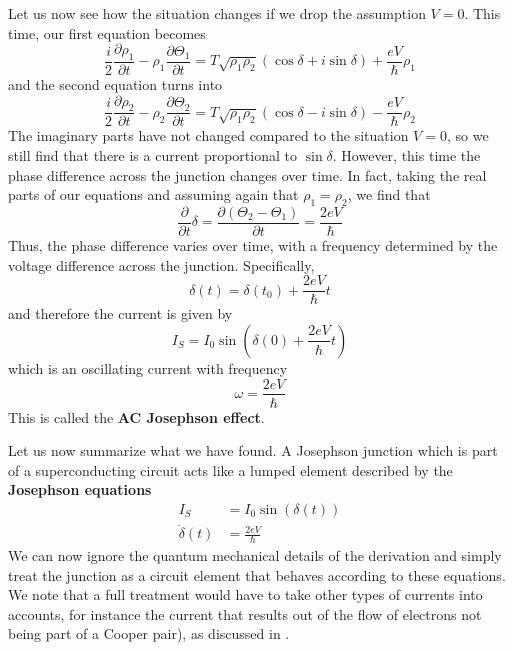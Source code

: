 \documentclass[a4paper, draft]{article}
\theoremstyle{own}
\theoremstyle{remark}
\begin{document}
Let us now see how the situation changes if we drop the assumption $V = 0$. This time, our first equation becomes
$$
\frac{i }{2} \frac{\partial \rho_1}{\partial t} 
- 
\rho_1 \frac{\partial \Theta_1}{\partial t}
=
 T \sqrt{\rho_1 \rho_2} (\cos \delta + i \sin \delta) + \frac{eV}{\hbar} \rho_1
$$
and the second equation turns into
$$
\frac{i }{2} \frac{\partial \rho_2}{\partial t} 
- 
\rho_2 \frac{\partial \Theta_2}{\partial t}
=
T \sqrt{\rho_1 \rho_2} (\cos \delta - i \sin \delta) - \frac{eV}{\hbar} \rho_2
$$
The imaginary parts have not changed compared to the situation $V = 0$, so we still find that there is a current proportional to $\sin \delta$. However, this time the phase difference across the junction changes over time. In fact, taking the real parts of our equations and assuming again that $\rho_1 = \rho_2$, we find that
$$
\frac{\partial}{\partial t} \delta = \frac{\partial (\Theta_2 - \Theta_1)}{\partial t} =   \frac{2eV}{\hbar}
$$
Thus, the phase difference varies over time, with a frequency determined by the voltage difference across the junction. Specifically, 
$$
\delta(t) = \delta(t_0) + \frac{2eV}{\hbar} t
$$
and therefore the current is given by
$$
I_S = I_0 \sin (\delta(0) + \frac{2eV}{\hbar} t)
$$
which is an oscillating current with frequency 
$$
\omega = \frac{2eV}{\hbar}
$$
This is called the {\bf AC Josephson effect}.

Let us now summarize what we have found. A Josephson junction which is part of a superconducting circuit acts like a lumped element described by the {\bf Josephson equations}
\begin{align}\label{eq:josephson}
I_S &= I_0 \sin (\delta(t)) \\
\dot{\delta}(t) &=  \frac{2eV}{\hbar} 
\end{align}
We can now ignore the quantum mechanical details of the derivation and simply treat the junction as a circuit element that behaves according to these equations. We note that a full treatment would have to take other types of currents into accounts, for instance the current that results out of the flow of electrons not being part of a Cooper pair), as discussed in \cite{Likharev}. 
\end{document}
